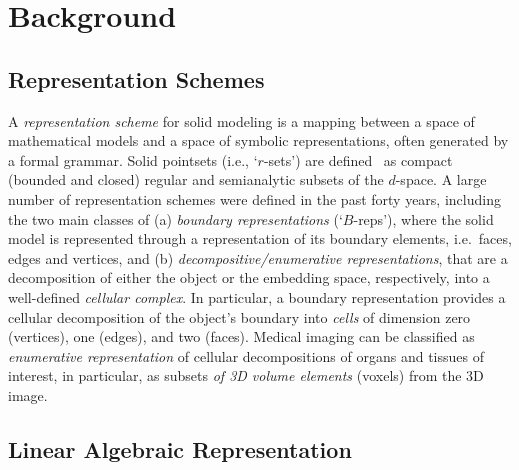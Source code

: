 \section{Background}\label{sec:background}


\subsection{Representation Schemes}\label{sec:aaaa}

A \emph{representation scheme} for solid modeling is a mapping between a space of mathematical models and a space of symbolic representations, often generated by a formal grammar.
Solid pointsets (i.e., `$r$-sets') are defined~\cite{Requicha:1980:RRS:356827.356833} as compact (bounded and closed) regular and semianalytic subsets of the $d$-space. A large number of representation schemes were defined in the past forty years, including the two main classes of (a) \emph{boundary representations} (`$B$-reps'), where the solid model is represented through a representation of its boundary elements, i.e.~faces, edges and vertices, and (b) \emph{decompositive/enumerative representations}, that are a decomposition of either the object or the embedding space, respectively, into a well-defined \emph{cellular complex}. In particular, a boundary representation provides a cellular decomposition of the object's boundary into \emph{cells} of dimension zero (vertices), one (edges), and two (faces). Medical imaging can be classified as \emph{enumerative representation} of cellular decompositions of organs and tissues of interest, in particular, as subsets \emph{of 3D volume elements} (voxels) from the 3D image. 


\subsection{Linear Algebraic Representation}\label{sec:aaaa}

